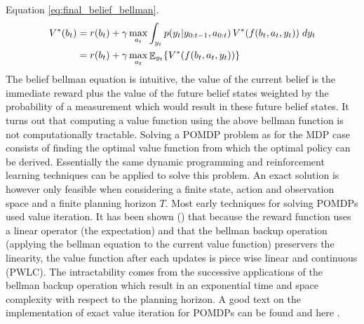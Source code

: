 Equation \ref{eq:final_belief_bellman}.
\begin{align}\label{eq:final_belief_bellman}
  V^*(b_t) &= r(b_t) + \gamma \max_{a_t} \int_{y_t}  p(y_t|y_{0:t-1},a_{0:t}) \,V^*(f(b_t,a_t,y_t))\; dy_t \nonumber  \\ 
	   &= r(b_t) + \gamma \max_{a_t} \operatorname{\displaystyle \mathop{\mathbb{E}}}_{y_t}\{V^*(f(b_t,a_t,y_t))\}
\end{align}
The belief bellman equation is intuitive, the value of the current belief is the immediate reward plus the value of the 
future belief states weighted by the probability of a measurement which would result in these future belief states. 
It turns out that computing a value function using the above bellman function is not computationally tractable. Solving 
a POMDP problem as for the MDP case consists of finding the optimal value function from which the optimal policy can 
be derived. Essentially the same dynamic programming and reinforcement learning techniques can be applied to solve 
this problem. An exact solution is however only  feasible when considering a finite state, action and observation space and
a finite planning horizon $T$. Most early techniques for solving POMDPs used value iteration. It has been shown (\cite{Sondik_1973}) 
that because the reward function uses a linear operator (the expectation) and that the bellman backup operation 
(applying the bellman equation to the current value function) preservers the linearity, the value function after each 
updates is piece wise linear and continuous (PWLC). The intractability comes from the successive applications 
of the bellman backup operation which result in an exponential time and space complexity with respect to the planning horizon.
A good text on the implementation of exact value iteration for POMDPs can be found \cite[Chap. 15]{Thrun_2005}
and here \cite{Kaelbling_1998}.




